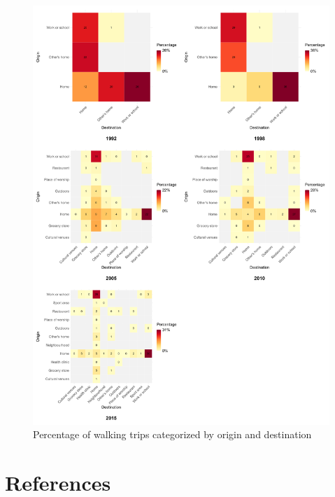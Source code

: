 \documentclass[preprint, 3p,
authoryear]{elsarticle} %
\begin{document}
\begin{figure}

{\centering \includegraphics[width=1\linewidth]{figures/cycling_hm_fig} 

}

\caption{Percentage of walking trips categorized by origin and destination}\label{fig:cycling-heatmap}
\end{figure}

\hypertarget{references}{%
\section*{References}\label{references}}
\end{document}
